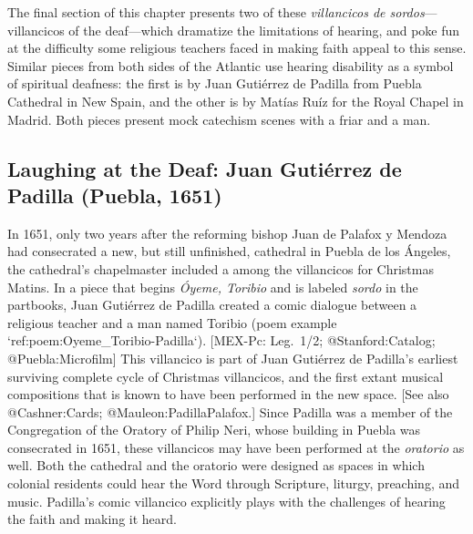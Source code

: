 The final section of this chapter presents two of these \emph{villancicos de sordos}---villancicos of the deaf---which dramatize the limitations of hearing, and poke fun at the difficulty some religious teachers faced in making faith appeal to this sense.
Similar pieces from both sides of the Atlantic use hearing disability as a symbol of spiritual deafness: the first is by Juan Gutiérrez de Padilla from Puebla Cathedral in New Spain, and the other is by Matías Ruíz for the Royal Chapel in Madrid.
Both pieces present mock catechism scenes with a friar and a  man.


\subsection{Laughing at the Deaf: Juan Gutiérrez de Padilla (Puebla, 1651)}

In 1651, only two years after the reforming bishop Juan de Palafox y Mendoza had consecrated a new, but still unfinished, cathedral in Puebla de los Ángeles, the cathedral's chapelmaster included a  among the villancicos for Christmas Matins.
In a piece that begins \emph{Óyeme, Toribio} and is labeled \emph{sordo} in the partbooks,  Juan Gutiérrez de Padilla created a comic dialogue between a religious teacher and a  man named Toribio (poem example `ref:poem:Oyeme_Toribio-Padilla`).
[MEX-Pc: Leg.~1/2; @Stanford:Catalog; @Puebla:Microfilm]
This villancico is part of Juan Gutiérrez de Padilla's earliest surviving complete cycle of Christmas villancicos, and the first extant musical compositions that is known to have been performed in the new space.
[See also @Cashner:Cards; @Mauleon:PadillaPalafox.]
Since Padilla was a member of the Congregation of the Oratory of Philip Neri, whose building in Puebla was consecrated in 1651, these villancicos may have been performed at the \emph{oratorio} as well.
Both the cathedral and the oratorio were designed as spaces in which colonial residents could hear the Word through Scripture, liturgy, preaching, and music.
Padilla's comic  villancico explicitly plays with the challenges of hearing the faith and making it heard.


